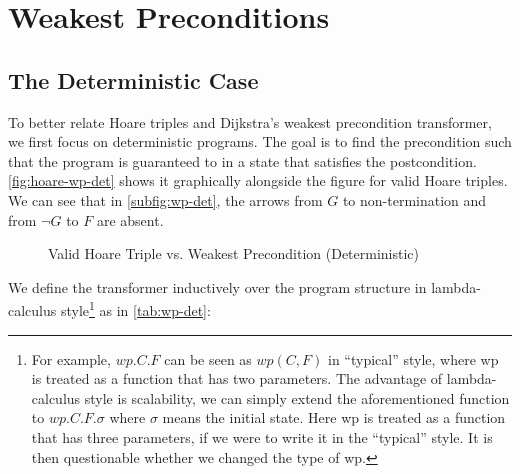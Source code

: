 \section{Weakest Preconditions}\label{sec:wp}

\subsection{The Deterministic Case}\label{sec:wp-det}
To better relate Hoare triples and Dijkstra's weakest precondition transformer, we first focus on deterministic programs. 
The goal is to find the  precondition such that the program is guaranteed to  in a state that satisfies the postcondition. 
\autoref{fig:hoare-wp-det} shows it graphically alongside the figure for valid Hoare triples. 
We can see that in \autoref{subfig:wp-det}, the arrows from $G$ to non-termination and from $\neg G$ to $F$ are absent. 

\begin{figure}[ht!]\centering
  \hfill
\caption{Valid Hoare Triple vs. Weakest Precondition (Deterministic)}
\label{fig:hoare-wp-det}
\end{figure}

We define the  transformer inductively over the program structure in lambda-calculus style\footnote{For example, $wp.C.F$ can be seen as $wp(C,F)$ in ``typical'' style, where wp is treated as a function that has two parameters. The advantage of lambda-calculus style is scalability, we can simply extend the aforementioned function to $wp.C.F.\sigma$ where $\sigma$ means the initial state. Here wp is treated as a function that has three parameters, if we were to write it in the ``typical'' style. It is then questionable whether we changed the type of wp. } as in \autoref{tab:wp-det}: 

